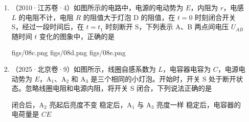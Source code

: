 \documentclass[\gkver]{gaokaozhenti}
\newcommand{\source}[1]{{\sffamily（#1）}}
\begin{document}
\begin{enumerate}
\item
\source{2010·江苏卷·4}如图所示的电路中，电源的电动势为 $E$，内阻为 $r$，电感 $L$ 的电阻不计，电阻 $R$ 的阻值大于灯泡 D 的阻值，在 $t=0$ 时刻闭合开关 S，经过一段时间后，在 $t=t_{1}$ 时刻断开 S，下列表示 A、B 两点间电压 $U_{AB}$ 随时间 $t$ 变化的图象中，正确的是


{figs/08c.png}
{figs/08d.png}
{figs/08e.png}


\item
\source{2025·北京卷·9}如图所示，线圈自感系数为 $L$，电容器电容为 $C$，电源电动势为 $E$，A$_{1}$、A$_{2}$ 和 A$_{3}$ 是三个相同的小灯泡。开始时，开关 S 处于断开状态。忽略线圈电阻和电源内阻，将开关 S 闭合，下列说法正确的是


{闭合后，A$_{2}$ 亮起后亮度不变}
{稳定后，A$_{1}$ 与 A$_{3}$ 亮度一样}
{稳定后，电容器的电荷量是 $CE$}

\end{enumerate}
\end{document}
